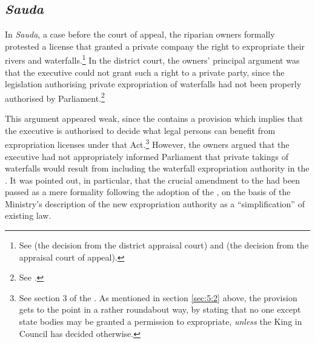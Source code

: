 


\subsection{{\it Sauda}}\label{sec:5:5:1}

In {\it Sauda}, a case before the court of appeal, the riparian owners formally protested a license that granted a private company the right to expropriate their rivers and waterfalls.\footnote{See \cite{sauda07} (the decision from the district appraisal court) and \cite{sauda09} (the decision from the appraisal court of appeal).} In the district court, the owners' principal argument was that the executive could not grant such a right to a private party, since the legislation authorising private expropriation of waterfalls had not been properly authorised by Parliament.\footnote{See \cite{sauda07}.}

This argument appeared weak, since the \cite{ea59} contains a provision which implies that the executive is authorised to decide what legal persons can benefit from expropriation licenses under that Act.\footnote{See section 3 of the \cite{ea59}. As mentioned in section \ref{sec:5:2} above, the provision gets to the point in a rather roundabout way, by stating that no one except state bodies may be granted a permission to expropriate, {\it unless} the King in Council has decided otherwise.} However, the owners argued that the executive had not appropriately informed Parliament that private takings of waterfalls would result from including the waterfall expropriation authority in the \cite{ea59}. It was pointed out, in particular, that the crucial amendment to the \cite{ea59} had been passed as a mere formality following the adoption of the \cite{wra00}, on the basis of the Ministry's description of the new expropriation authority as a ``simplification'' of existing law.

